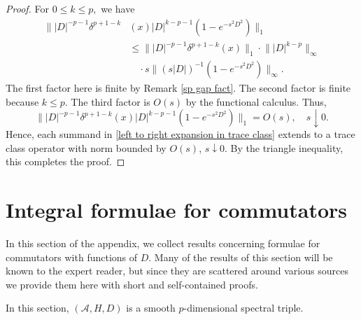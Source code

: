 \begin{proof}
        For $0\leq k\leq p,$ we have
        \begin{align*}
            \Big\||D|^{-p-1}\delta^{p+1-k}&(x)|D|^{k-p-1}(1-e^{-s^2D^2})\Big\|_1\\
                                          &\leq\Big\||D|^{-p-1}\delta^{p+1-k}(x)\Big\|_1\cdot\Big\||D|^{k-p}\Big\|_{\infty}\\
                                          &\quad\cdot s\Big\|(s|D|)^{-1}(1-e^{-s^2D^2})\Big\|_{\infty}.
        \end{align*}
        The first factor here is finite by Remark \ref{sp gap fact}. The second factor is finite because $k\leq p.$ The third factor is $O(s)$ by the functional calculus. Thus,
        \begin{equation*}
            \||D|^{-p-1}\delta^{p+1-k}(x)|D|^{k-p-1}(1-e^{-s^2D^2})\|_1=O(s),\quad s\downarrow0.
        \end{equation*}        
        Hence, each summand in \eqref{left to right expansion in trace class} extends to a trace class operator with norm bounded by $O(s)$, $s\downarrow 0$. By the triangle
        inequality, this completes the proof.        
    \end{proof}

\section{Integral formulae for commutators}\label{integral app}
    In this section of the appendix, we collect results concerning formulae for commutators with functions of $D$. Many of the results of this section
    will be known to the expert reader, but since they are scattered around various sources we provide them here with short and self-contained proofs.

    In this section, $(\mathcal{A},H,D)$ is a smooth $p$-dimensional spectral triple. 
    
